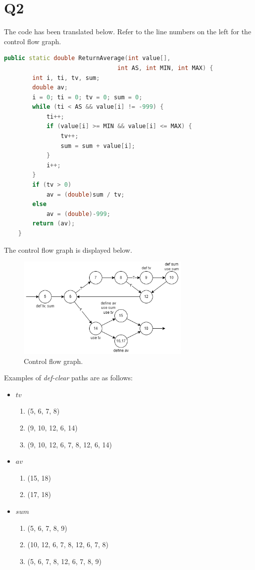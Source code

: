 \documentclass[12pt, letterpaper, titlepage]{article}
\begin{document}
\section*{Q2}
The code has been translated below. Refer to the line numbers on the left for the control flow graph.
\begin{lstlisting}[language=C++]
    public static double ReturnAverage(int value[], 
                                int AS, int MIN, int MAX) {
        int i, ti, tv, sum;
        double av;
        i = 0; ti = 0; tv = 0; sum = 0;
        while (ti < AS && value[i] != -999) {
            ti++;
            if (value[i] >= MIN && value[i] <= MAX) {
                tv++;
                sum = sum + value[i];
            }
            i++;
        }
        if (tv > 0)
            av = (double)sum / tv;
        else
            av = (double)-999;
        return (av);
    }
\end{lstlisting}

\noindent
The control flow graph is displayed below.
\begin{figure}[H]
    \centering
    \caption{Control flow graph.}
    \includegraphics[width=0.75\textwidth]{Q2.png}
\end{figure}

\noindent
Examples of \textit{def-clear} paths are as follows:
\begin{itemize}
    \item $tv$
    \begin{enumerate}
        \item (5, 6, 7, 8)
        \item (9, 10, 12, 6, 14)
        \item (9, 10, 12, 6, 7, 8, 12, 6, 14)
    \end{enumerate}
    \item $av$
    \begin{enumerate}
        \item (15, 18)
        \item (17, 18)
    \end{enumerate}
    \item $sum$
    \begin{enumerate}
        \item (5, 6, 7, 8, 9)
        \item (10, 12, 6, 7, 8, 12, 6, 7, 8)
        \item (5, 6, 7, 8, 12, 6, 7, 8, 9)
    \end{enumerate}
\end{itemize}
\end{document}
